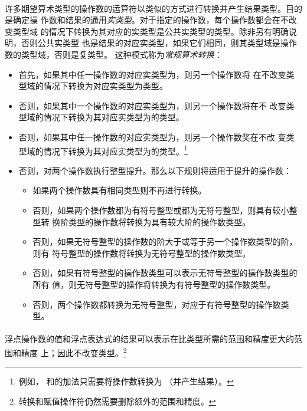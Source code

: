 \paragraph{}
许多期望算术类型的操作数的运算符以类似的方式进行转换并产生结果类型。目的是确定操
作数和结果的通用\textit{实类型}。对于指定的操作数，每个操作数都会在不改变类型域
的情况下转换为其对应的实类型是公共实类型的类型。除非另有明确说明，否则公共实类型
也是结果的对应实类型，如果它们相同，则其类型域是操作数的类型域，否则是复类型。
这种模式称为\textit{常规算术转换}：
\begin{itemize}
  \item{首先，如果其中任一操作数的对应实类型为，则另一个操作数将
    在不改变类型域的情况下转换为对应实类型为类型。}
  \item{否则，如果其中一个操作数的对应实类型为，则另一个操作数将在不
    改变类型域的情况下转换为其对应实类型为的类型。}
  \item{否则，如果其中任一操作数的对应实类型为，则另一个操作数奖在不改
    变类型域的情况下转换为其对应实类型为的类型。\footnote{例如，
    和的加法只需要将操作数转换为
    （并产生结果）。}}
  \item{否则，对两个操作数执行整型提升。那么以下规则将适用于提升的操作数：
    \begin{itemize}
      \item{如果两个操作数具有相同类型则不再进行转换。}
      \item{否则，如果两个操作数都为有符号整型或都为无符号整型，则具有较小整型转
        换阶类型的操作数将转换为具有较大阶的操作数类型。}
      \item{否则，如果无符号整型的操作数的阶大于或等于另一个操作数类型的阶，则有
        符号整型的操作数将转换为无符号整型的操作数类型。}
      \item{否则，如果有符号整型的操作数类型可以表示无符号整型的操作数类型的所有
        值，则无符号整型的操作将转换为有符号整型的操作数类型。}
      \item{否则，两个操作数都转换为无符号整型，对应于有符号整型的操作数类型。}
    \end{itemize}}
\end{itemize}

\paragraph{}
浮点操作数的值和浮点表达式的结果可以表示在比类型所需的范围和精度更大的范围和精度
上；因此不改变类型。\footnote{转换和赋值操作符仍然需要删除额外的范围和精度。}

